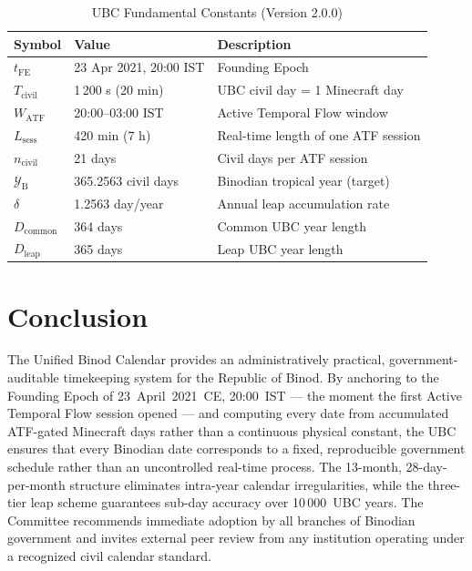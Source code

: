 \documentclass[journal,twoside]{IEEEtran}
\begin{document}
\begin{table}[!t]
\centering
\caption{UBC Fundamental Constants (Version 2.0.0)}
\label{tab:constants}
\begin{tabular}{@{}lll@{}}
\toprule
\textbf{Symbol} & \textbf{Value} & \textbf{Description} \\
\midrule
$t_{\mathrm{FE}}$ & 23 Apr 2021, 20:00 IST & Founding Epoch \\
$T_{\mathrm{civil}}$ & 1\,200 s (20 min) & UBC civil day = 1 Minecraft day \\
$W_{\mathrm{ATF}}$ & 20:00--03:00 IST & Active Temporal Flow window \\
$L_{\mathrm{sess}}$ & 420 min (7 h) & Real-time length of one ATF session \\
$n_{\mathrm{civil}}$ & 21 days & Civil days per ATF session \\
$\mathcal{Y}_{\mathrm{B}}$ & 365.2563 civil days & Binodian tropical year (target) \\
$\delta$         & 1.2563 day/year           & Annual leap accumulation rate \\
$D_{\mathrm{common}}$ & 364 days             & Common UBC year length \\
$D_{\mathrm{leap}}$   & 365 days             & Leap UBC year length \\
\bottomrule
\end{tabular}
\end{table}

\section{Conclusion}

The Unified Binod Calendar provides an administratively practical, government-auditable
timekeeping system for the Republic of Binod. By anchoring to the Founding Epoch of
23~April~2021~CE, 20:00~IST --- the moment the first Active Temporal Flow session opened
--- and computing every date from accumulated ATF-gated Minecraft days rather than a
continuous physical constant, the UBC ensures that every Binodian date corresponds to a
fixed, reproducible government schedule rather than an uncontrolled real-time process.
The 13-month, 28-day-per-month structure eliminates intra-year calendar irregularities,
while the three-tier leap scheme guarantees sub-day accuracy over 10\,000~UBC years.
The Committee recommends immediate adoption by all branches of Binodian government
and invites external peer review from any institution operating under a recognized
civil calendar standard.
\end{document}
